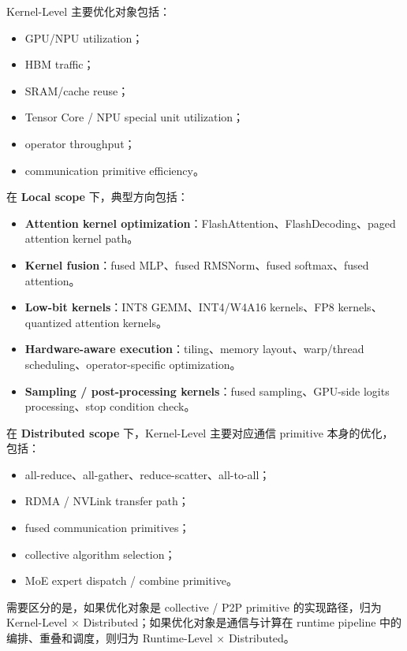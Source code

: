\documentclass[a4paper,twocolumn,10pt]{ctexart}
\begin{document}
Kernel-Level 主要优化对象包括：


\begin{itemize}
\item GPU/NPU utilization；

\item HBM traffic；

\item SRAM/cache reuse；

\item Tensor Core / NPU special unit utilization；

\item operator throughput；

\item communication primitive efficiency。

\end{itemize}
在 \textbf{Local scope} 下，典型方向包括：


\begin{itemize}
\item \textbf{Attention kernel optimization}：FlashAttention、FlashDecoding、paged attention kernel path。

\item \textbf{Kernel fusion}：fused MLP、fused RMSNorm、fused softmax、fused attention。

\item \textbf{Low-bit kernels}：INT8 GEMM、INT4/W4A16 kernels、FP8 kernels、quantized attention kernels。

\item \textbf{Hardware-aware execution}：tiling、memory layout、warp/thread scheduling、operator-specific optimization。

\item \textbf{Sampling / post-processing kernels}：fused sampling、GPU-side logits processing、stop condition check。

\end{itemize}
在 \textbf{Distributed scope} 下，Kernel-Level 主要对应通信 primitive 本身的优化，包括：


\begin{itemize}
\item all-reduce、all-gather、reduce-scatter、all-to-all；

\item RDMA / NVLink transfer path；

\item fused communication primitives；

\item collective algorithm selection；

\item MoE expert dispatch / combine primitive。

\end{itemize}
需要区分的是，如果优化对象是 collective / P2P primitive 的实现路径，归为 Kernel-Level × Distributed；如果优化对象是通信与计算在 runtime pipeline 中的编排、重叠和调度，则归为 Runtime-Level × Distributed。
\end{document}
